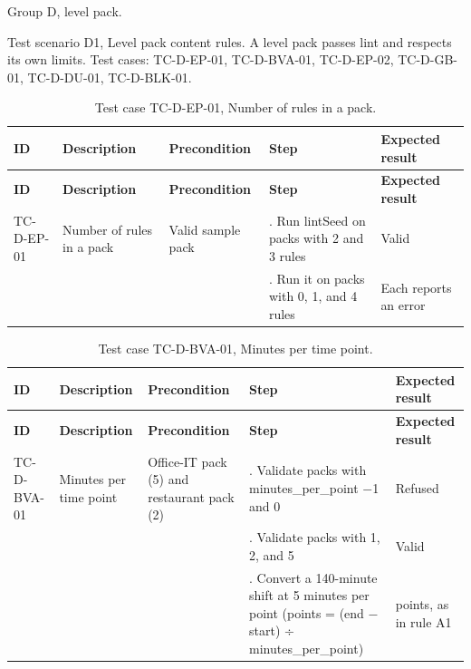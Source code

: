 Group D, level pack.

Test scenario D1, Level pack content rules. A level pack passes lint and respects its own limits. Test cases: TC-D-EP-01, TC-D-BVA-01, TC-D-EP-02, TC-D-GB-01, TC-D-DU-01, TC-D-BLK-01.

{\small
\begin{longtable}{|>{\raggedright\arraybackslash}p{}|>{\raggedright\arraybackslash}p{}|>{\raggedright\arraybackslash}p{}|>{\raggedright\arraybackslash}p{}|>{\raggedright\arraybackslash}p{}|}
\caption{Test case TC-D-EP-01, Number of rules in a pack.} \\
\hline
\textbf{ID} & \textbf{Description} & \textbf{Precondition} & \textbf{Step} & \textbf{Expected result} \\ \hline
\endfirsthead
\hline
\textbf{ID} & \textbf{Description} & \textbf{Precondition} & \textbf{Step} & \textbf{Expected result} \\ \hline
\endhead
TC-D-EP-01 & Number of rules in a pack & Valid sample pack & 1. Run lintSeed on packs with 2 and 3 rules & Valid \\ \hline
 &  &  & 2. Run it on packs with 0, 1, and 4 rules & Each reports an error \\ \hline
\end{longtable}
}

{\small
\begin{longtable}{|>{\raggedright\arraybackslash}p{}|>{\raggedright\arraybackslash}p{}|>{\raggedright\arraybackslash}p{}|>{\raggedright\arraybackslash}p{}|>{\raggedright\arraybackslash}p{}|}
\caption{Test case TC-D-BVA-01, Minutes per time point.} \\
\hline
\textbf{ID} & \textbf{Description} & \textbf{Precondition} & \textbf{Step} & \textbf{Expected result} \\ \hline
\endfirsthead
\hline
\textbf{ID} & \textbf{Description} & \textbf{Precondition} & \textbf{Step} & \textbf{Expected result} \\ \hline
\endhead
TC-D-BVA-01 & Minutes per time point & Office-IT pack (5) and restaurant pack (2) & 1. Validate packs with minutes\_per\_point $-$1 and 0 & Refused \\ \hline
 &  &  & 2. Validate packs with 1, 2, and 5 & Valid \\ \hline
 &  &  & 3. Convert a 140-minute shift at 5 minutes per point (points = (end $-$ start) ÷ minutes\_per\_point) & 28 points, as in rule A1 \\ \hline
\end{longtable}
}

